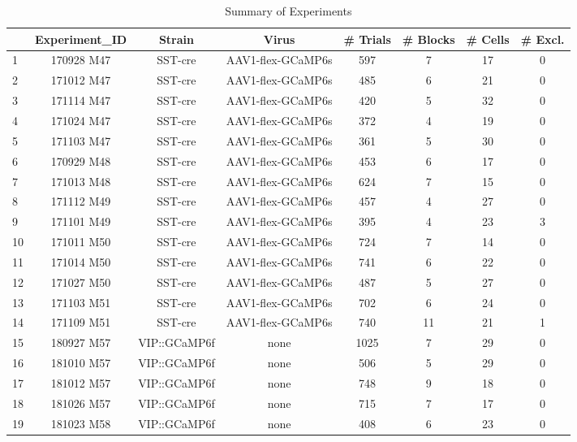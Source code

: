 \begin{table*}[htbp]
  \centering
  \caption{Summary of Experiments}
  \begin{tabular}{lccccccc}
          & Experiment\_ID & Strain & Virus &  \# Trials & \# Blocks & \# Cells & \# Excl. \\
          \midrule
    1     & 170928 M47 & SST-cre & AAV1-flex-GCaMP6s & 597   & 7     & 17    & 0 \\
    2     & 171012 M47 & SST-cre & AAV1-flex-GCaMP6s & 485   & 6     & 21    & 0 \\
    3     & 171114 M47 & SST-cre & AAV1-flex-GCaMP6s & 420   & 5     & 32    & 0 \\
    4     & 171024 M47 & SST-cre & AAV1-flex-GCaMP6s & 372   & 4     & 19    & 0 \\
    5     & 171103 M47 & SST-cre & AAV1-flex-GCaMP6s & 361   & 5     & 30    & 0 \\
    6     & 170929 M48 & SST-cre & AAV1-flex-GCaMP6s & 453   & 6     & 17    & 0 \\
    7     & 171013 M48 & SST-cre & AAV1-flex-GCaMP6s & 624   & 7     & 15    & 0 \\
    8     & 171112 M49 & SST-cre & AAV1-flex-GCaMP6s & 457   & 4     & 27    & 0 \\
    9     & 171101 M49 & SST-cre & AAV1-flex-GCaMP6s & 395   & 4     & 23    & 3 \\
    10    & 171011 M50 & SST-cre & AAV1-flex-GCaMP6s & 724   & 7     & 14    & 0 \\
    11    & 171014 M50 & SST-cre & AAV1-flex-GCaMP6s & 741   & 6     & 22    & 0 \\
    12    & 171027 M50 & SST-cre & AAV1-flex-GCaMP6s & 487   & 5     & 27    & 0 \\
    13    & 171103 M51 & SST-cre & AAV1-flex-GCaMP6s & 702   & 6     & 24    & 0 \\
    14    & 171109 M51 & SST-cre & AAV1-flex-GCaMP6s & 740   & 11    & 21    & 1 \\
    15    & 180927 M57 & VIP::GCaMP6f & none  & 1025  & 7     & 29    & 0 \\
    16    & 181010 M57 & VIP::GCaMP6f & none  & 506   & 5     & 29    & 0 \\
    17    & 181012 M57 & VIP::GCaMP6f & none  & 748   & 9     & 18    & 0 \\
    18    & 181026 M57 & VIP::GCaMP6f & none  & 715   & 7     & 17    & 0 \\
    19    & 181023 M58 & VIP::GCaMP6f & none  & 408   & 6     & 23    & 0 \\

\end{tabular}
\end{table*}
